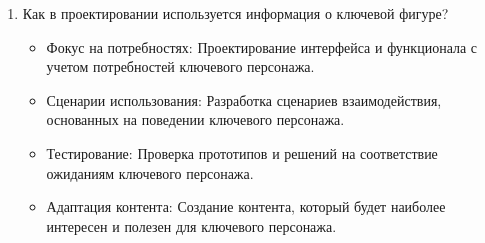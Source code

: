 \begin{enumerate}
\item Как в проектировании используется информация о ключевой фигуре?
    \begin{itemize}
        \item Фокус на потребностях: Проектирование интерфейса и функционала с учетом потребностей ключевого персонажа.
        \item Сценарии использования: Разработка сценариев взаимодействия, основанных на поведении ключевого персонажа.
        \item Тестирование: Проверка прототипов и решений на соответствие ожиданиям ключевого персонажа.
        \item Адаптация контента: Создание контента, который будет наиболее интересен и полезен для ключевого персонажа.
    \end{itemize}
\end{enumerate}

\begin{enumerate}
\end{enumerate}


